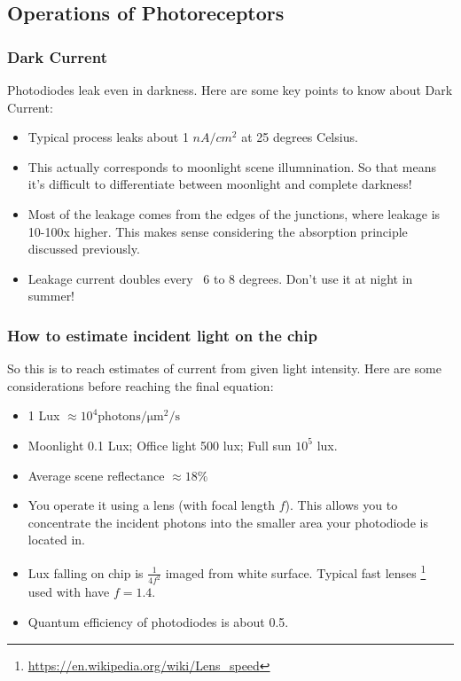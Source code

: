 \subsection{Operations of Photoreceptors}

\subsubsection{Dark Current}

Photodiodes leak even in darkness. Here are some key points to know about Dark Current:
\begin{itemize}
    \item Typical process leaks about 1 $nA/cm^2$ at 25 degrees Celsius.
    \item This actually corresponds to moonlight scene illumnination. So that means it's difficult to differentiate between moonlight and complete darkness!
    \item Most of the leakage comes from the edges of the junctions, where leakage is 10-100x higher. This makes sense considering the absorption principle discussed previously. 
    \item Leakage current doubles every ~6 to 8 degrees. Don't use it at night in summer!
\end{itemize}

\subsubsection{How to estimate incident light on the chip}

So this is to reach estimates of current from given light intensity. Here are some considerations before reaching the final equation: 

\begin{itemize}
    \item 1 Lux $\approx 10^4 \mathrm{photons/\mu m^2/s}$
    \item Moonlight 0.1 Lux; Office light 500 lux; Full sun $10^5$ lux.
    \item Average scene reflectance $\approx 18\%$
    \item You operate it using a lens (with focal length $f$). This allows you to concentrate the incident photons into the smaller area your photodiode is located in.   
    \item Lux falling on chip is $\frac{1}{4 f^2}$ imaged from white surface. Typical fast lenses \footnote{\url{https://en.wikipedia.org/wiki/Lens_speed}} used with have $f = 1.4$.
    \item Quantum efficiency of photodiodes is about 0.5.
\end{itemize}

